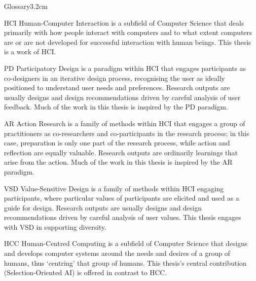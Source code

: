 


\begin{mclistof}{Glossary}{3.2cm}
    \item[HCI] Human-Computer Interaction is a subfield of Computer Science that deals primarily with how people interact with computers and to what extent computers are or are not developed for successful interaction with human beings. This thesis is a work of HCI.

    \item[PD] Participatory Design is a paradigm within HCI that engages participants as co-designers in an iterative design process, recognising the user as ideally positioned to understand user needs and preferences. Research outputs are usually designs and design recommendations driven by careful analysis of user feedback. Much of the work in this thesis is inspired by the PD paradigm.

    \item[AR] Action Research is a family of methods within HCI that engages a group of practitioners as co-researchers and co-participants in the research process; in this case, preparation is only one part of the research process, while action and reflection are equally valuable. Research outputs are ordinarily learnings that arise from the action. Much of the work in this thesis is inspired by the AR paradigm.

    \item[VSD] Value-Sensitive Design is a family of methods within HCI engaging participants, where particular values of participants are elicited and used as a guide for design. Research outputs are usually designs and design recommendations driven by careful analysis of user values. This thesis engages with VSD in supporting diversity.

    \item[HCC] Human-Centred Computing is a subfield of Computer Science that designs and develops computer systems around the needs and desires of a group of humans, thus `centring' that group of humans. This thesis's central contribution (Selection-Oriented AI) is offered in contrast to HCC.


\end{mclistof}
